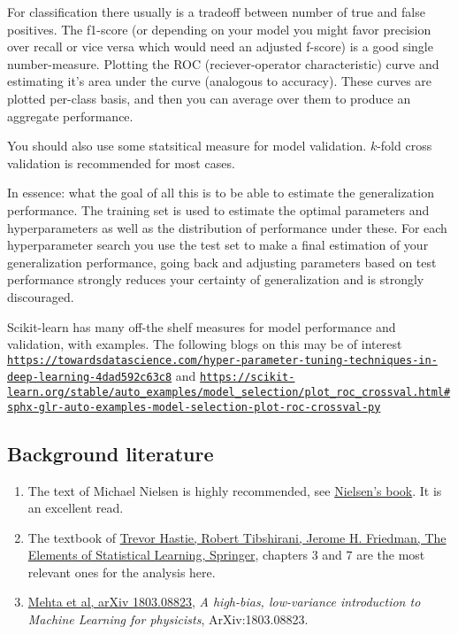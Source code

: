 \documentclass[%
oneside,                 %
final,                   %
10pt]{article}
\begin{document}
For classification there usually is a tradeoff between number of true
and false positives. The f1-score (or depending on your model you
might favor precision over recall or vice versa which would need an
adjusted f-score) is a good single number-measure. Plotting the ROC
(reciever-operator characteristic) curve and estimating it's area
under the curve (analogous to accuracy). These curves are plotted
per-class basis, and then you can average over them to produce an
aggregate performance.

You should also use some statsitical measure for model
validation. $k$-fold cross validation is recommended for most cases.

In essence: what the goal of all this is to be able to estimate the
generalization performance. The training set is used to estimate the
optimal parameters and hyperparameters as well as the distribution of
performance under these. For each hyperparameter search you use the
test set to make a final estimation of your generalization
performance, going back and adjusting parameters based on test
performance strongly reduces your certainty of generalization and is
strongly discouraged.

Scikit-learn has many off-the shelf measures for model performance and validation, with examples.  The following blogs on this may be of interest
\href{{https://towardsdatascience.com/hyper-parameter-tuning-techniques-in-deep-learning-4dad592c63c8}}{\nolinkurl{https://towardsdatascience.com/hyper-parameter-tuning-techniques-in-deep-learning-4dad592c63c8}} and 
\href{{https://scikit-learn.org/stable/auto_examples/model_selection/plot_roc_crossval.html#sphx-glr-auto-examples-model-selection-plot-roc-crossval-py}}{\nolinkurl{https://scikit-learn.org/stable/auto_examples/model_selection/plot_roc_crossval.html\#sphx-glr-auto-examples-model-selection-plot-roc-crossval-py}}

\subsection{Background literature}

\begin{enumerate}
\item The text of Michael Nielsen is highly recommended, see \href{{http://neuralnetworksanddeeplearning.com/}}{Nielsen's book}. It is an excellent read.

\item The textbook of \href{{https://www.springer.com/gp/book/9780387848570}}{Trevor Hastie, Robert Tibshirani, Jerome H. Friedman, The Elements of Statistical Learning, Springer}, chapters 3 and 7 are the most relevant ones for the analysis here. 

\item \href{{https://arxiv.org/abs/1803.08823}}{Mehta et al, arXiv 1803.08823}, \emph{A high-bias, low-variance introduction to Machine Learning for physicists}, ArXiv:1803.08823.
\end{enumerate}
\end{document}
